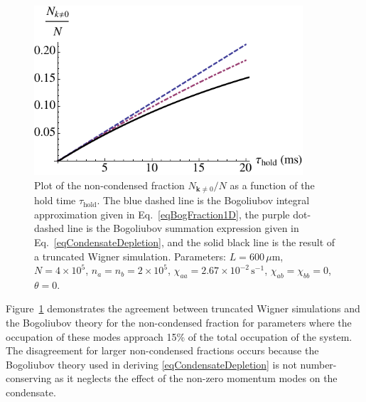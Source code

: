 \documentclass{iopart}
\begin{document}
\begin{figure}
    \centering
    \includegraphics[width=10cm]{figures/Bog_validation}
\caption{Plot of the non-condensed fraction $N_{\mathbf{k}\neq0}/N$ as a function of the hold time $\tau_\text{hold}$.  The blue dashed line is the Bogoliubov integral approximation given in Eq.~\ref{eqBogFraction1D}, the purple dot-dashed line is the Bogoliubov summation expression given in Eq.~\ref{eqCondensateDepletion}, and the solid black line is the result of a truncated Wigner simulation.  Parameters: $L=600\,\mu\text{m}$, $N=4 \times 10^5$, $n_a=n_b=2\times 10^5$, $\chi_{aa} = 2.67 \times 10^{-2}\, \text{s}^{-1}$, $\chi_{ab}=\chi_{bb}=0$, $\theta=0$.}
  \label{figBogSqueezingValidation}
\end{figure}


Figure~\ref{figBogSqueezingValidation} demonstrates the agreement between truncated Wigner simulations and the Bogoliubov theory for the non-condensed fraction for parameters where the occupation of these modes approach 15\% of the total occupation of the system.  The disagreement for larger non-condensed fractions occurs because the Bogoliubov theory used in deriving \eqref{eqCondensateDepletion} is not number-conserving as it neglects the effect of the non-zero momentum modes on the condensate.  
\end{document}
